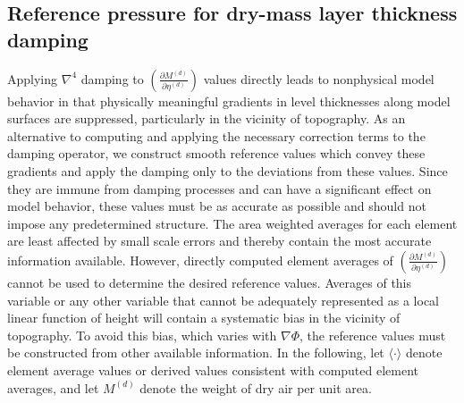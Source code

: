 \documentclass{agujournal}
\begin{document}
{\subsection{Reference pressure for dry-mass layer thickness damping}\label{app:ref_dp}
Applying $\nabla^4$ damping to $\left( \frac{\partial M^{(d)}}{\partial \eta^{(d)}}\right)$ values directly leads to nonphysical model behavior in that physically meaningful gradients in level thicknesses along model surfaces are suppressed, particularly in the vicinity of topography. As an alternative to computing and applying the necessary correction terms to the damping operator, we construct smooth reference values which convey these gradients and apply the damping only to the deviations from these values. Since they are immune from damping processes and can have a significant effect on model behavior, these values must be as accurate as possible and should not impose any predetermined structure. The area weighted averages for each element are least affected by small scale errors and thereby contain the most accurate information available. However, directly computed element averages of $\left( \frac{\partial M^{(d)}}{\partial \eta^{(d)}}\right)$ cannot be used to determine the desired reference values. Averages of this variable or any other variable that cannot be adequately represented as a local linear function of height will contain a systematic bias in the vicinity of topography. To avoid this bias, which varies with $\nabla \Phi$, the reference values must be constructed from other available information. In the following, let $\langle \cdot \rangle$ denote element average values or derived values consistent with computed element averages, and let $M^{(d)}$ denote the weight of dry air per unit area.

}
\end{document}
